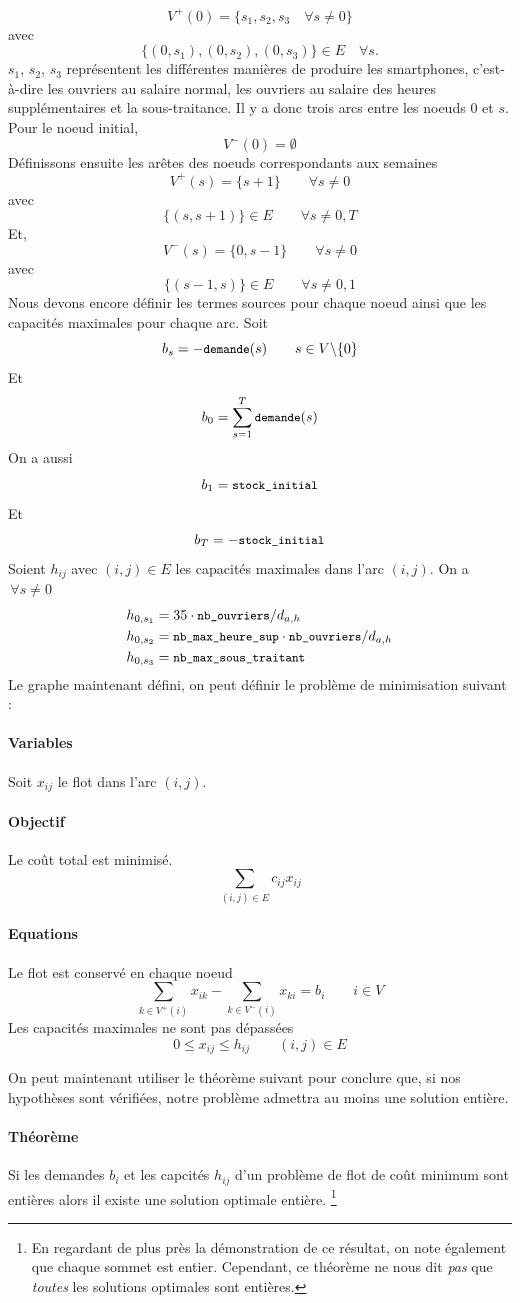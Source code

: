 \[ V^{+}(0) = \{s_1, s_2, s_3 \quad \forall s \ne 0\} \]
avec
\[ \{(0, s_1), (0, s_2), (0, s_3)\} \in E \quad \forall s. \]
$s_1$, $s_2$, $s_3$ représentent les différentes manières de produire les smartphones, c'est-à-dire les ouvriers au salaire normal, les ouvriers au salaire des heures supplémentaires et la sous-traitance.
Il y a donc trois arcs entre les noeuds $0$ et $s$.
Pour le noeud initial,
\[ V^{-}(0) = \emptyset \]
Définissons ensuite les arêtes des noeuds correspondants aux semaines
\[ V^{+}(s) = \{s+1\} \qquad \forall s \ne 0 \]
avec 
\[ \{(s, s+1)\} \in E \qquad \forall s \ne 0, T \]
Et,
\[ V^{-}(s) = \{0, s-1\} \qquad \forall s \ne 0 \]
avec
\[ \{(s-1, s)\} \in E \qquad \forall s \ne 0, 1 \]
Nous devons encore définir les termes sources pour chaque noeud ainsi que les capacités maximales pour chaque arc.
Soit
\[ b_s = - {\small\texttt{demande}}(s) \qquad s \in V \backslash \{0\} \]
Et 
\[ b_0 = \sum_{s=1}^{T} {\small\texttt{demande}}(s) \]  
On a aussi
\[ b_1 = {\small\texttt{stock\_initial}} \]
Et
\[ b_T = - {\small\texttt{stock\_initial}} \]
Soient $h_{ij}$ avec $(i, j) \in E$ les capacités maximales dans l'arc $(i, j)$.
On a $\, \forall s \ne 0$ 
\begin{align*}
  h_{0, s_1} &= 35\cdot {\small\texttt{nb\_ouvriers}}/ d_{a,h} \\
  h_{0, s_2} &= {\small\texttt{nb\_max\_heure\_sup}}\cdot{\small\texttt{nb\_ouvriers}}/ d_{a,h} \\
  h_{0, s_3} &= {\small\texttt{nb\_max\_sous\_traitant}} 
\end{align*}
Le graphe maintenant défini, 
on peut définir le problème de minimisation suivant :
\paragraph{Variables}
Soit $x_{ij}$ le flot dans l'arc $(i, j)$.
\paragraph{Objectif}
Le coût total est minimisé.
\[ \sum_{(i, j) \in E} c_{ij} x_{ij} \]
\paragraph{Equations} Le flot est conservé en chaque noeud
\[ \sum_{k \in V^{+}(i)} x_{ik} - \sum_{k \in V^{-}(i)} x_{ki} 
  = b_i \qquad i \in V
\]
Les capacités maximales ne sont pas dépassées
\[ 0 \leq x_{ij} \leq h_{ij} \qquad (i, j) \in E \]

On peut maintenant utiliser le théorème suivant pour conclure que, si nos hypothèses sont vérifiées, notre problème admettra au moins une solution entière.
\paragraph{Théorème}
Si les demandes $b_i$ et les capcités $h_{ij}$ 
d'un problème de flot de coût minimum sont entières alors il existe une solution optimale entière.
\footnote{En regardant de plus près la démonstration de ce résultat,
on note également que chaque sommet est entier. 
Cependant, ce théorème ne nous dit \emph{pas} que \emph{toutes} 
les solutions optimales sont entières.}